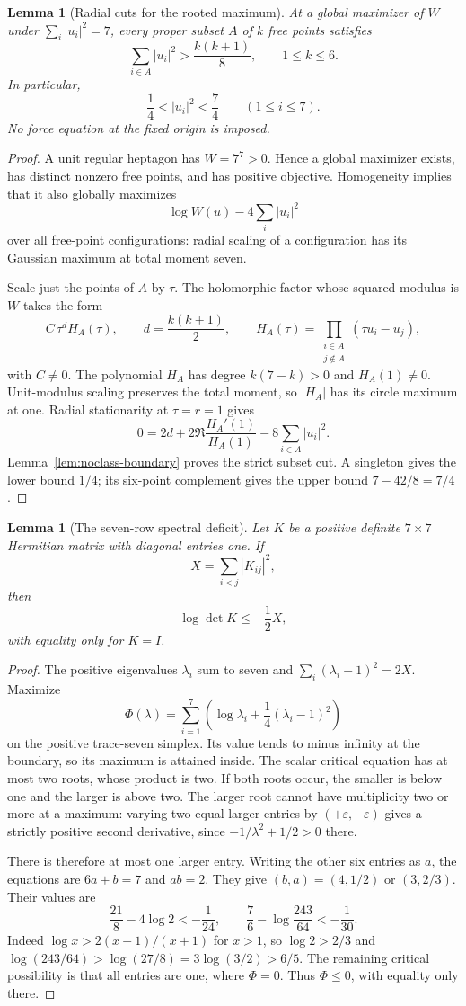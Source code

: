 \documentclass[11pt]{article}
\newtheorem{lemma}[theorem]{Lemma}
\theoremstyle{remark}
\numberwithin{equation}{section}
\begin{document}
\begin{lemma}[Radial cuts for the rooted maximum]
\label{lem:noclass-rooted-radii}
At a global maximizer of $W$ under $\sum_i|u_i|^2=7$,
every proper subset $A$ of $k$ free points satisfies
\[
 \sum_{i\in A}|u_i|^2>\frac{k(k+1)}8,\qquad 1\le k\le6.
\]
In particular,
\[
 \frac14<|u_i|^2<\frac74\qquad(1\le i\le7).
\]
No force equation at the fixed origin is imposed.
\end{lemma}
\begin{proof}
A unit regular heptagon has $W=7^7>0$. Hence a global
maximizer exists, has distinct nonzero free points, and has positive
objective. Homogeneity implies that it also globally maximizes
\[
 \log W(u)-4\sum_i|u_i|^2
\]
over all free-point configurations: radial scaling of a configuration
has its Gaussian maximum at total moment seven.

Scale just the points of $A$ by $\tau$. The holomorphic factor
whose squared modulus is $W$ takes the form
\[
 C\,\tau^d H_A(\tau),\qquad
 d=\frac{k(k+1)}2,\qquad
 H_A(\tau)=\prod_{\substack{i\in A\\j\notin A}}(\tau u_i-u_j),
\]
with $C\ne0$. The polynomial $H_A$ has degree $k(7-k)>0$
and $H_A(1)\ne0$. Unit-modulus scaling preserves the total
moment, so $|H_A|$ has its circle maximum at one.
Radial stationarity at $\tau=r=1$ gives
\[
 0=2d+2\Re\frac{H_A'(1)}{H_A(1)}
       -8\sum_{i\in A}|u_i|^2.
\]
Lemma~\ref{lem:noclass-boundary} proves the strict subset cut.
A singleton gives the lower bound $1/4$; its six-point
complement gives the upper bound $7-42/8=7/4$.
\end{proof}

\begin{lemma}[The seven-row spectral deficit]
\label{lem:noclass-seven-gram}
Let $K$ be a positive definite $7\times7$ Hermitian matrix
with diagonal entries one. If
\[
 X=\sum_{i<j}|K_{ij}|^2,
\]
then
\[
 \log\det K\le-\frac12X,
\]
with equality only for $K=I$.
\end{lemma}
\begin{proof}
The positive eigenvalues $\lambda_i$ sum to seven and
$\sum_i(\lambda_i-1)^2=2X$. Maximize
\[
 \Phi(\lambda)=\sum_{i=1}^7
 \left(\log\lambda_i+\frac14(\lambda_i-1)^2\right)
\]
on the positive trace-seven simplex. Its value tends to minus
infinity at the boundary, so its maximum is attained inside.
The scalar critical equation has at most two roots, whose product
is two. If both roots occur, the smaller is below one and the
larger is above two. The larger root cannot have multiplicity
two or more at a maximum: varying two equal larger entries by
$(+\varepsilon,-\varepsilon)$ gives a strictly positive second
derivative, since $-1/\lambda^2+1/2>0$ there.

There is therefore at most one larger entry. Writing the other
six entries as $a$, the equations are $6a+b=7$ and $ab=2$.
They give $(b,a)=(4,1/2)$ or $(3,2/3)$. Their values are
\[
 \frac{21}8-4\log2<-\frac1{24},\qquad
 \frac76-\log\frac{243}{64}<-\frac1{30}.
\]
Indeed $\log x>2(x-1)/(x+1)$ for $x>1$,
so $\log2>2/3$ and
$\log(243/64)>\log(27/8)=3\log(3/2)>6/5$.
The remaining critical possibility is that all entries are one,
where $\Phi=0$. Thus $\Phi\le0$, with equality only there.
\end{proof}
\end{document}
